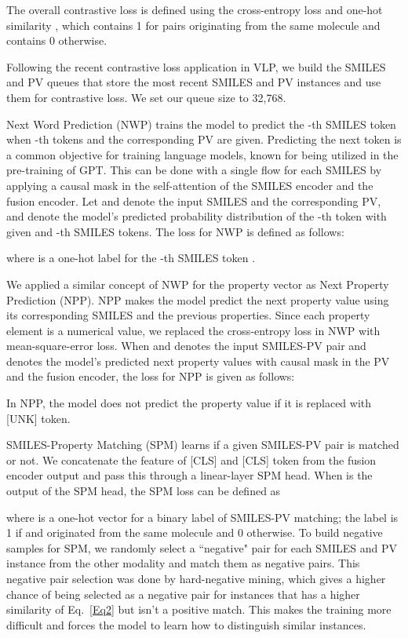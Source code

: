 \documentclass{nature_meth}
\newcommand{\1}{\blmath{1}}
\newcommand{\0}{\blmath{0}}
\begin{document}
The overall contrastive loss is defined using the cross-entropy loss  and one-hot similarity , which contains 1 for pairs originating from the same molecule and contains 0 otherwise.

Following the recent contrastive loss application in VLP\cite{moco}, we build the SMILES and PV queues that store the  most recent SMILES and PV instances and use them for contrastive loss. We set our queue size  to 32,768.

Next Word Prediction (NWP) trains the model to predict the -th SMILES token when -th tokens and the corresponding PV are given. Predicting the next token is a common objective for training language models, known for being utilized in the pre-training of GPT\cite{gpt3}. This can be done with a single flow for each SMILES by applying a causal mask in the self-attention of the SMILES encoder and the fusion encoder. Let  and  denote the input SMILES and the corresponding PV, and  denote the model's predicted probability distribution of the -th token with given  and -th SMILES tokens. The loss for NWP is defined as follows:

where  is a one-hot label for the -th SMILES token .


We applied a similar concept of NWP for the property vector as Next Property Prediction (NPP). NPP makes the model predict the next property value using its corresponding SMILES and the previous properties. Since each property element is a numerical value, we replaced the cross-entropy loss in NWP with mean-square-error loss. When  and  denotes the input SMILES-PV pair and  denotes the model's predicted next property values with causal mask in the PV and the fusion encoder, the loss for NPP is given as follows:

In NPP, the model does not predict the property value if it is replaced with [UNK] token.

SMILES-Property Matching (SPM) learns if a given SMILES-PV pair  is matched or not. We concatenate the feature of [CLS] and [CLS] token from the fusion encoder output and pass this through a linear-layer SPM head. When  is the output of the SPM head, the SPM loss can be defined as

where  is a one-hot vector for a binary label of SMILES-PV matching; the label is 1 if  and  originated from the same molecule and 0 otherwise.
To build negative samples for SPM, we randomly select a ``negative" pair for each SMILES and PV instance from the other modality and match them as negative pairs. 
This negative pair selection was done by hard-negative mining, which gives a higher chance of being selected as a negative pair for instances that has a higher similarity of Eq.~\eqref{Eq2} but isn't a positive match.
This makes the training more difficult and forces the model to learn how to distinguish similar instances.
\end{document}
